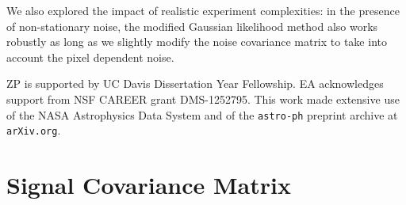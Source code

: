 \documentclass[aps, prd, reprint, nofootinbib, groupedaddress, showpacs]{revtex4-1}
\begin{document}
We also explored the impact of realistic experiment complexities:
in the presence of non-stationary noise, the modified Gaussian likelihood method also works robustly
as long as we slightly modify the noise covariance matrix to take into account the pixel dependent noise.


\begin{acknowledgements}
ZP is supported by UC Davis Dissertation Year Fellowship.
EA acknowledges support from NSF CAREER grant DMS-1252795.
This work made extensive use of the NASA Astrophysics Data System and
of the {\tt astro-ph} preprint archive at {\tt arXiv.org}.
\end{acknowledgements}



\appendix
\section{Signal Covariance Matrix}
\label{sec:app1}
\end{document}
